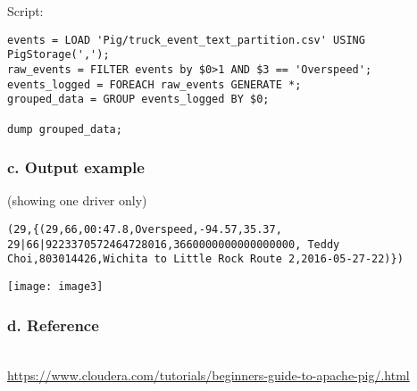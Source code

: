 \documentclass[]{article}
\begin{document}
Script:
\begin{verbatim}
events = LOAD 'Pig/truck_event_text_partition.csv' USING PigStorage(',');
raw_events = FILTER events by $0>1 AND $3 == 'Overspeed';
events_logged = FOREACH raw_events GENERATE *;
grouped_data = GROUP events_logged BY $0;

dump grouped_data;
\end{verbatim}

\subsubsection*{c. Output example }(showing one driver only)
\begin{verbatim}
(29,{(29,66,00:47.8,Overspeed,-94.57,35.37, 29|66|9223370572464728016,3660000000000000000, Teddy Choi,803014426,Wichita to Little Rock Route 2,2016-05-27-22)})
\end{verbatim}

\texttt{[image: image3]}

\subsubsection*{d. Reference} \phantom{1em}\\
\href{https://www.cloudera.com/tutorials/beginners-guide-to-apache-pig/.html}	{https://www.cloudera.com/tutorials/beginners-guide-to-apache-pig/.html}
\end{document}
